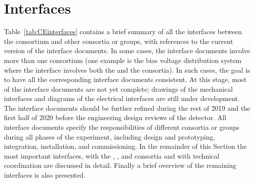 \section{Interfaces}
\label{sec:fdsp-tpcelec-interfaces}

Table~\ref{tab:CEinterfaces} contains a brief summary of all the interfaces
between the  consortium and other consortia or groups,
with references to the current version of the interface documents. 
In some cases, the interface documents involve more than one 
consortium (one example is the bias voltage distribution system where
the interface involves both the  and the  consortia).
In such cases, the goal is to have all the corresponding interface documents 
consistent. At this stage, most of the interface documents are
not yet complete; drawings of the mechanical interfaces and diagrams
of the electrical interfaces are still under development. The interface 
documents should be further refined during the rest of 2019 and the 
first half of 2020 before the engineering design
reviews of the detector. All interface documents specify the responsibilities
of different consortia or groups during all phases of the experiment,
including design and prototyping, integration, installation,
and commissioning. In the remainder of this Section the most
important interfaces, with the , , and 
consortia and with technical coordination are discussed in detail.
Finally a brief overview of the remaining interfaces is also presented.


